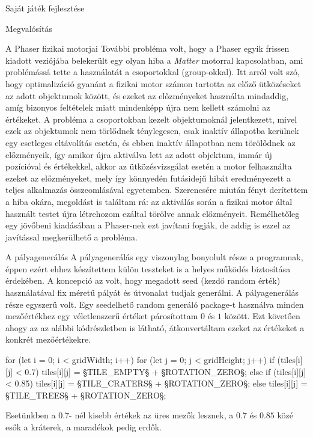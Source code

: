 \begin{MyChapter}{Saját játék fejlesztése}
\begin{MySection}{Megvalósítás}
\begin{MySubSection}{A Phaser fizikai motorjai}
			További probléma volt, hogy a Phaser egyik frissen kiadott veziójába belekerült egy olyan hiba a \textit{Matter} motorral kapcsolatban, ami problémássá tette a használatát a csoportokkal (group-okkal). Itt arról volt szó, hogy optimalizáció gyanánt a fizikai motor számon tartotta az előző ütközéseket az adott objektumok között, és ezeket az előzményeket használta mindaddig, amíg bizonyos feltételek miatt mindenképp újra nem kellett számolni az értékeket. A probléma a csoportokban kezelt objektumoknál jelentkezett, mivel ezek az objektumok nem törlődnek ténylegesen, csak inaktív állapotba kerülnek egy esetleges eltávolítás esetén, és ebben inaktív állapotban nem törölődnek az előzményeik, így amikor újra aktiválva lett az adott objektum, immár új pozícióval és értékekkel, akkor az ütközésvizsgálat esetén a motor felhasználta ezeket az előzményeket, mely így könnyedén futásidejű hibát eredményezett a teljes alkalmazás összeomlásával egyetemben. Szerencsére miután fényt derítettem a hiba okára, megoldást is találtam rá: az aktiválás során a fizikai motor által használt testet újra létrehozom ezáltal törölve annak előzményeit. Remélhetőleg egy jövőbeni kiadásában a Phaser-nek ezt javítani fogják, de addig is ezzel az javítással megkerülhető a probléma.
		\end{MySubSection}
		
		\begin{MySubSection}{A pályagenerálás}
			A pályagenerálás egy viszonylag bonyolult része a programnak, éppen ezért ehhez készítettem külön teszteket is a helyes működés biztosítása érdekében.
			A koncepció az volt, hogy megadott seed (kezdő random érték) használatával fix méretű pályát és útvonalat tudjak generálni. A pályagenerálás része egyszerű volt. Egy seedelhető random generáló package-t használva minden mezőértékhez egy véletlenszerű értéket párosítottam $0$ és $1$ között. Ezt követően ahogy az az alábbi kódrészletben is látható, átkonvertáltam ezeket az értékeket a konkrét mezőértékekre.
			\begin{javascript}
for (let i = 0; i < gridWidth; i++) {
	for (let j = 0; j < gridHeight; j++) {
		if (tiles[i][j] < 0.7) {
			tiles[i][j] = §\color{jsConst}TILE\_EMPTY§ + §\color{jsConst}ROTATION\_ZERO§;
		} else if (tiles[i][j] < 0.85) {
			tiles[i][j] = §\color{jsConst}TILE\_CRATERS§ + §\color{jsConst}ROTATION\_ZERO§;
		} else {
			tiles[i][j] = §\color{jsConst}TILE\_TREES§ + §\color{jsConst}ROTATION\_ZERO§;
		}
	}
}
			\end{javascript}
			Esetünkben a $0.7$- nél kisebb értékek az üres mezők lesznek, a $0.7$ és $0.85$ közé esők a kráterek, a maradékok pedig erdők.
			

\end{MySubSection}
\end{MySection}
\end{MyChapter}
